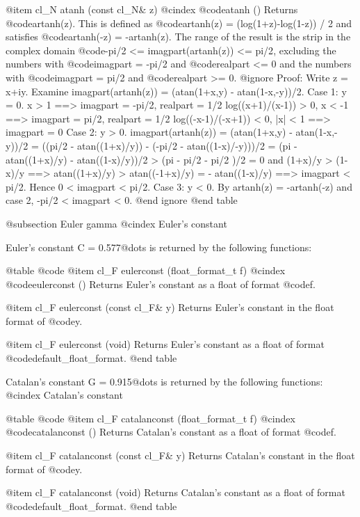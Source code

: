 @item cl_N atanh (const cl_N& z)
@cindex @code{atanh ()}
Returns @code{artanh(z)}. This is defined as
@code{artanh(z) = (log(1+z)-log(1-z)) / 2} and satisfies
@code{artanh(-z) = -artanh(z)}. The range of the result is
the strip in the complex domain
@code{-pi/2 <= imagpart(artanh(z)) <= pi/2}, excluding the numbers
with @code{imagpart = -pi/2} and @code{realpart <= 0} and the numbers
with @code{imagpart = pi/2} and @code{realpart >= 0}.
@ignore
Proof: Write z = x+iy. Examine
  imagpart(artanh(z)) = (atan(1+x,y) - atan(1-x,-y))/2.
  Case 1: y = 0.
          x > 1 ==> imagpart = -pi/2, realpart = 1/2 log((x+1)/(x-1)) > 0,
          x < -1 ==> imagpart = pi/2, realpart = 1/2 log((-x-1)/(-x+1)) < 0,
          |x| < 1 ==> imagpart = 0
  Case 2: y > 0.
          imagpart(artanh(z))
              = (atan(1+x,y) - atan(1-x,-y))/2
              = ((pi/2 - atan((1+x)/y)) - (-pi/2 - atan((1-x)/-y)))/2
              = (pi - atan((1+x)/y) - atan((1-x)/y))/2
              > (pi -     pi/2      -     pi/2     )/2 = 0
          and (1+x)/y > (1-x)/y
              ==> atan((1+x)/y) > atan((-1+x)/y) = - atan((1-x)/y)
              ==> imagpart < pi/2.
          Hence 0 < imagpart < pi/2.
  Case 3: y < 0.
          By artanh(z) = -artanh(-z) and case 2, -pi/2 < imagpart < 0.
@end ignore
@end table


@subsection Euler gamma
@cindex Euler's constant

Euler's constant C = 0.577@dots{} is returned by the following functions:

@table @code
@item cl_F eulerconst (float_format_t f)
@cindex @code{eulerconst ()}
Returns Euler's constant as a float of format @code{f}.

@item cl_F eulerconst (const cl_F& y)
Returns Euler's constant in the float format of @code{y}.

@item cl_F eulerconst (void)
Returns Euler's constant as a float of format @code{default_float_format}.
@end table

Catalan's constant G = 0.915@dots{} is returned by the following functions:
@cindex Catalan's constant

@table @code
@item cl_F catalanconst (float_format_t f)
@cindex @code{catalanconst ()}
Returns Catalan's constant as a float of format @code{f}.

@item cl_F catalanconst (const cl_F& y)
Returns Catalan's constant in the float format of @code{y}.

@item cl_F catalanconst (void)
Returns Catalan's constant as a float of format @code{default_float_format}.
@end table


